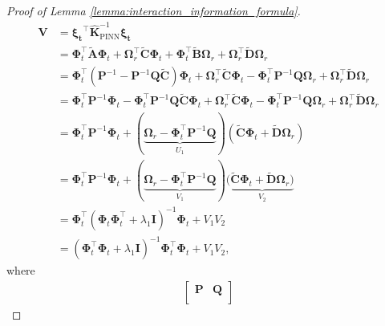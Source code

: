 \begin{proof}[Proof of Lemma \ref{lemma:interaction_information_formula}]
\begin{align*}
            \mathbf{V} &= \boldsymbol{\boldsymbol{\xi}_t}^\top \mathbf{\widehat{K}}_\mathrm{PINN}^{-1} \boldsymbol{\boldsymbol{\xi}_t} 
\\
            &=\boldsymbol{\Phi}_t^\top \widetilde{\mathbf{A}}\boldsymbol{\Phi}_t + \boldsymbol{\Omega}_r^\top \widetilde{\mathbf{C}}\boldsymbol{\Phi}_t + \boldsymbol{\Phi}_t^\top \widetilde{\mathbf{B}}\boldsymbol{\Omega}_r + \boldsymbol{\Omega}_r^\top \widetilde{\mathbf{D}}\boldsymbol{\Omega}_r 
\\
            & = \boldsymbol{\Phi}_t^\top (\mathbf{P}^{-1} - \mathbf{P}^{-1}\mathbf{Q}\widetilde{\mathbf{C}})\boldsymbol{\Phi}_t + \boldsymbol{\Omega}_r^\top \widetilde{\mathbf{C}}\boldsymbol{\Phi}_t - \boldsymbol{\Phi}_t^\top \mathbf{P}^{-1}\mathbf{Q}\boldsymbol{\Omega}_r + \boldsymbol{\Omega}_r^\top \widetilde{\mathbf{D}}\boldsymbol{\Omega}_r 
\\
            & = \boldsymbol{\Phi}_t^\top \mathbf{P}^{-1}\boldsymbol{\Phi}_t - \boldsymbol{\Phi}_t^\top\mathbf{P}^{-1}\mathbf{Q}\widetilde{\mathbf{C}}\boldsymbol{\Phi}_t + \boldsymbol{\Omega}_r^\top \widetilde{\mathbf{C}}\boldsymbol{\Phi}_t - \boldsymbol{\Phi}_t^\top \mathbf{P}^{-1}\mathbf{Q}\boldsymbol{\Omega}_r + \boldsymbol{\Omega}_r^\top \widetilde{\mathbf{D}}\boldsymbol{\Omega}_r 
\\
            & = \boldsymbol{\Phi}_t^\top \mathbf{P}^{-1}\boldsymbol{\Phi}_t + (\underbrace{\boldsymbol{\Omega}_r - \boldsymbol{\Phi}_t^\top\mathbf{P}^{-1}\mathbf{Q}}_{U_1})(\widetilde{\mathbf{C}}\boldsymbol{\Phi}_t + \widetilde{\mathbf{D}}\boldsymbol{\Omega}_r) 
\\
            & = \boldsymbol{\Phi}_t^\top \mathbf{P}^{-1}\boldsymbol{\Phi}_t + (\underbrace{\boldsymbol{\Omega}_r - \boldsymbol{\Phi}_t^\top\mathbf{P}^{-1}\mathbf{Q}}_{V_1})(\underbrace{\widetilde{\mathbf{C}}\boldsymbol{\Phi}_t + \widetilde{\mathbf{D}}\boldsymbol{\Omega}_r)}_{V_2} \\
            & = \boldsymbol{\Phi}_t^\top (\boldsymbol{\Phi}_t\boldsymbol{\Phi}_t^\top+\lambda_1 \mathbf{I})^{-1} \boldsymbol{\Phi}_t + V_1V_2
\\
            & = (\boldsymbol{\Phi}_t^\top\boldsymbol{\Phi}_t+\lambda_1 \mathbf{I})^{-1} \boldsymbol{\Phi}_t^\top\boldsymbol{\Phi}_t + V_1V_2,
\end{align*}
where 
\begin{align*}
            \begin{bmatrix}
            \mathbf{P} & \mathbf{Q} \\

\end{bmatrix}
\end{align*}
\end{proof}
